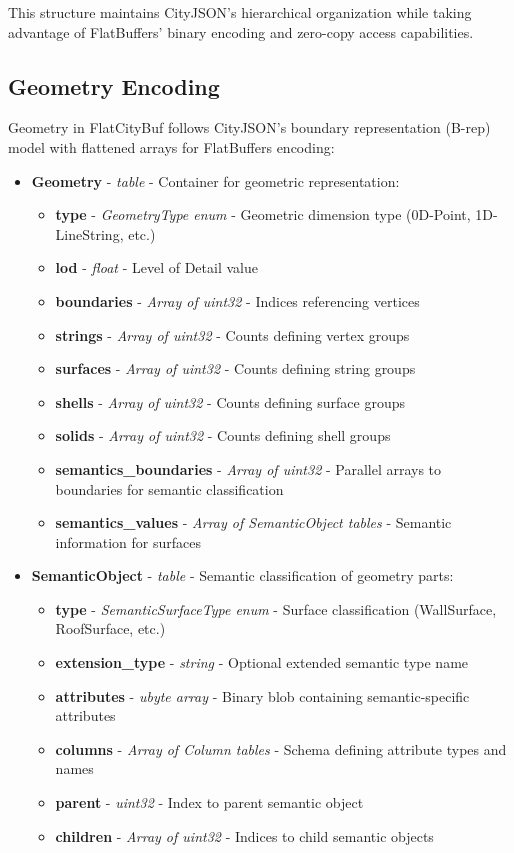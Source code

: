 This structure maintains CityJSON's hierarchical organization while taking advantage of FlatBuffers' binary encoding and zero-copy access capabilities.

\subsection{Geometry Encoding}
\label{methodology:feature_encoding:geometry_encoding}

Geometry in FlatCityBuf follows CityJSON's boundary representation (B-rep) model with flattened arrays for FlatBuffers encoding:

\begin{itemize}
  \item \textbf{Geometry} - \textit{table} - Container for geometric representation:
    \begin{itemize}
      \item \textbf{type} - \textit{GeometryType enum} - Geometric dimension type (0D-Point, 1D-LineString, etc.)
      \item \textbf{lod} - \textit{float} - Level of Detail value
      \item \textbf{boundaries} - \textit{Array of uint32} - Indices referencing vertices
      \item \textbf{strings} - \textit{Array of uint32} - Counts defining vertex groups
      \item \textbf{surfaces} - \textit{Array of uint32} - Counts defining string groups
      \item \textbf{shells} - \textit{Array of uint32} - Counts defining surface groups
      \item \textbf{solids} - \textit{Array of uint32} - Counts defining shell groups
      \item \textbf{semantics\_boundaries} - \textit{Array of uint32} - Parallel arrays to boundaries for semantic classification
      \item \textbf{semantics\_values} - \textit{Array of SemanticObject tables} - Semantic information for surfaces
    \end{itemize}

  \item \textbf{SemanticObject} - \textit{table} - Semantic classification of geometry parts:
    \begin{itemize}
      \item \textbf{type} - \textit{SemanticSurfaceType enum} - Surface classification (WallSurface, RoofSurface, etc.)
      \item \textbf{extension\_type} - \textit{string} - Optional extended semantic type name
      \item \textbf{attributes} - \textit{ubyte array} - Binary blob containing semantic-specific attributes
      \item \textbf{columns} - \textit{Array of Column tables} - Schema defining attribute types and names
      \item \textbf{parent} - \textit{uint32} - Index to parent semantic object
      \item \textbf{children} - \textit{Array of uint32} - Indices to child semantic objects
    \end{itemize}


\end{itemize}
